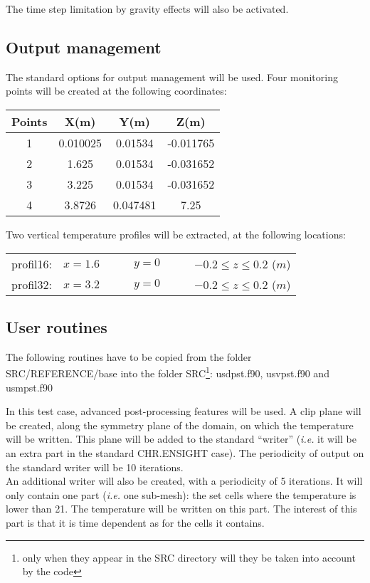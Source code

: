 The time step limitation by gravity effects will also be activated.


        \subsection{Output management}
The standard options for output management will be used. Four monitoring points
will be created at the following coordinates:

\begin{center}
\begin{tabular}{|c|c|c|c|}
\hline
Points & X(m) & Y(m) & Z(m)\\
\hline
1 & 0.010025 & 0.01534 & -0.011765 \\
\hline
2 & 1.625 & 0.01534 & -0.031652 \\
\hline
3 & 3.225 & 0.01534 & -0.031652 \\
\hline
4 & 3.8726 & 0.047481 & 7.25 \\
\hline
\end{tabular}
\end{center}


Two vertical temperature profiles will be extracted, at the following locations:\\
\begin{tabular}{llll}
profil16: & $x=1.6\qquad$ & $y=0\qquad$ & $-0.2 \leqslant z \leqslant 0.2$ ($m$)\\
profil32: & $x=3.2\qquad$ & $y=0\qquad$ & $-0.2 \leqslant z \leqslant 0.2$ ($m$)
\end{tabular}


        \subsection{User routines}

The following routines have to be copied from the folder SRC/REFERENCE/base into the
folder SRC\footnote{only when they appear in the SRC directory will they be
taken into account by the code}: usdpst.f90, usvpst.f90 and usmpst.f90

In this test case, advanced post-processing features will be used. A clip
plane will be created, along the symmetry plane of the domain, on which the
temperature will be written. This plane will be added to the standard
``writer'' ({\em i.e.} it will be an extra part in the standard CHR.ENSIGHT
case). The periodicity of output on the standard writer will be 10 iterations.\\
An additional writer will also be created, with a periodicity of 5
iterations. It will only contain one part ({\em i.e.} one sub-mesh): the set
cells where the temperature is lower than 21\degresC. The temperature will be
written on this part. The interest of this part is that it is time dependent
as for the cells it contains.

